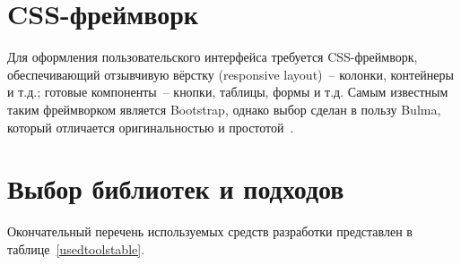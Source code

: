\section{CSS-фреймворк}

Для оформления пользовательского интерфейса требуется CSS-фреймворк, обеспечивающий
отзывчивую вёрстку (responsive layout)~-- колонки, контейнеры и т.д.;
готовые компоненты~-- кнопки, таблицы, формы и т.д. Самым известным таким фреймворком является Bootstrap,
однако выбор сделан в пользу Bulma, который отличается оригинальностью и простотой~\cite{bulma-vs-bootstrap}.

\section{Выбор библиотек и подходов}

Окончательный перечень используемых средств разработки представлен в таблице~\ref{usedtoolstable}.

